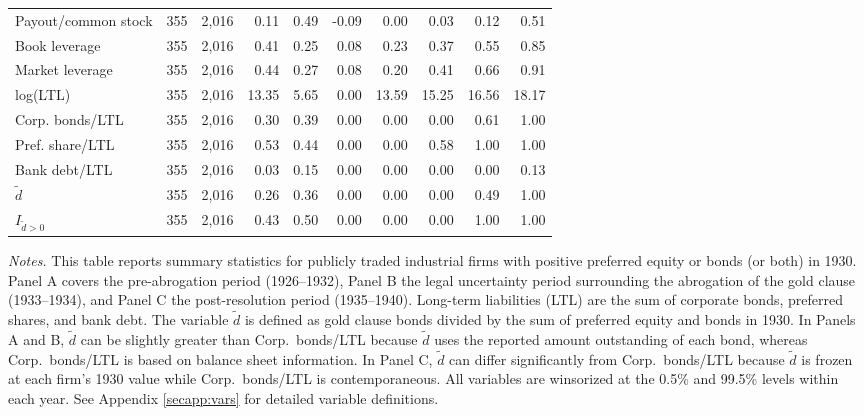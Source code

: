 \begin{table}[p]
\begin{threeparttable}
\begin{tabular}{lrrrrrrrrr}
            Payout/common stock & 355 & 2,016 & 0.11 & 0.49 & -0.09 & 0.00 & 0.03 & 0.12 & 0.51 \\
            Book leverage & 355 & 2,016 & 0.41 & 0.25 & 0.08 & 0.23 & 0.37 & 0.55 & 0.85 \\
            Market leverage & 355 & 2,016 & 0.44 & 0.27 & 0.08 & 0.20 & 0.41 & 0.66 & 0.91 \\
            log(LTL) & 355 & 2,016 & 13.35 & 5.65 & 0.00 & 13.59 & 15.25 & 16.56 & 18.17 \\
            Corp. bonds/LTL & 355 & 2,016 & 0.30 & 0.39 & 0.00 & 0.00 & 0.00 & 0.61 & 1.00 \\
            Pref. share/LTL & 355 & 2,016 & 0.53 & 0.44 & 0.00 & 0.00 & 0.58 & 1.00 & 1.00 \\
            Bank debt/LTL & 355 & 2,016 & 0.03 & 0.15 & 0.00 & 0.00 & 0.00 & 0.00 & 0.13 \\
            \ensuremath{\tilde{d}} & 355 & 2,016 & 0.26 & 0.36 & 0.00 & 0.00 & 0.00 & 0.49 & 1.00 \\
            \ensuremath{I_{\tilde{d}>0}} & 355 & 2,016 & 0.43 & 0.50 & 0.00 & 0.00 & 0.00 & 1.00 & 1.00 \\
            \bottomrule
        \end{tabular}
    \end{threeparttable}

\vspace*{3mm} \justifying \noindent
\scriptsize{\textit{Notes.} This table reports summary statistics for publicly traded industrial firms with positive preferred equity or bonds (or both) in 1930. Panel A covers the pre-abrogation period (1926--1932), Panel B the legal uncertainty period surrounding the abrogation of the gold clause (1933--1934), and Panel C the post-resolution period (1935--1940). Long-term liabilities (LTL) are the sum of corporate bonds, preferred shares, and bank debt. The variable $\tilde{d}$ is defined as gold clause bonds divided by the sum of preferred equity and bonds in 1930. In Panels A and B, $\tilde{d}$ can be slightly greater than Corp.\ bonds/LTL because $\tilde{d}$ uses the reported amount outstanding of each bond, whereas Corp.\ bonds/LTL is based on balance sheet information. In Panel C, $\tilde{d}$ can differ significantly from Corp.\ bonds/LTL because $\tilde{d}$ is frozen at each firm's 1930 value while Corp.\ bonds/LTL is contemporaneous. All variables are winsorized at the 0.5\% and 99.5\% levels within each year. See Appendix \ref{secapp:vars} for detailed variable definitions.}
\end{table}